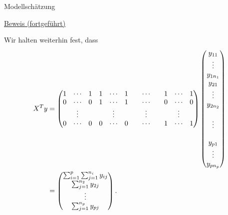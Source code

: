 \documentclass[
  8pt,
  ignorenonframetext,
]{beamer}
\begin{document}
\begin{frame}{Modellschätzung}
\protect\hypertarget{modellschuxe4tzung-3}{}
\footnotesize

\underline{Beweis (fortgeführt)}

Wir halten weiterhin fest, dass \tiny \begin{align}
\begin{split}
\renewcommand{\arraystretch}{1}
X^Ty
& =
\setcounter{MaxMatrixCols}{20}
\begin{pmatrix}
1 & \cdots & 1 & 1 & \cdots & 1 & & \cdots & & 1 & \cdots & 1   \\
0 & \cdots & 0 & 1 & \cdots & 1 & & \cdots & & 0 & \cdots & 0   \\
  & \vdots &   &   & \vdots &   & & \vdots & &   & \vdots &     \\
0 & \cdots & 0 & 0 & \cdots & 0 & & \cdots & & 1 & \cdots & 1   \\
\end{pmatrix}
\begin{pmatrix*}[c]
y_{11}  \\  \vdots  \\ y_{1n_1}
\\
y_{21}  \\  \vdots  \\ y_{2n_2}
\\      \\  \vdots  \\
\\
y_{p1}  \\  \vdots  \\ y_{pn_p}
\end{pmatrix*}
\\
& =
\begin{pmatrix}
\sum_{i=1}^p \sum_{j=1}^{n_i} y_{ij}    \\
\sum_{j=1}^{n_2} y_{2j}                 \\
\vdots                                  \\
\sum_{j=1}^{n_p} y_{pj}                 \\
\end{pmatrix}.
\end{split}
\end{align}
\end{frame}
\end{document}
